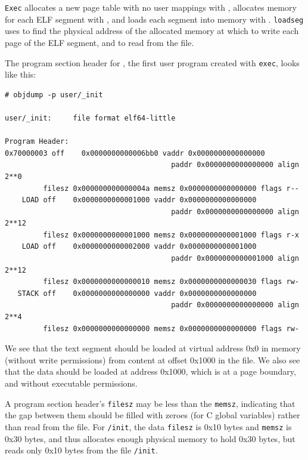 \lstinline{Exec}
allocates a new page table with no user mappings with
,
allocates memory for each ELF segment with
,
and loads each segment into memory with
.
\lstinline{loadseg}
uses
to find the physical address of the allocated memory at which to write
each page of the ELF segment, and
to read from the file.

The program section header for
,
the first user program created with
\lstinline{exec},
looks like this:
\begin{footnotesize}
\begin{verbatim}
# objdump -p user/_init

user/_init:     file format elf64-little

Program Header:
0x70000003 off    0x0000000000006bb0 vaddr 0x0000000000000000
                                       paddr 0x0000000000000000 align 2**0
         filesz 0x000000000000004a memsz 0x0000000000000000 flags r--
    LOAD off    0x0000000000001000 vaddr 0x0000000000000000
                                       paddr 0x0000000000000000 align 2**12
         filesz 0x0000000000001000 memsz 0x0000000000001000 flags r-x
    LOAD off    0x0000000000002000 vaddr 0x0000000000001000
                                       paddr 0x0000000000001000 align 2**12
         filesz 0x0000000000000010 memsz 0x0000000000000030 flags rw-
   STACK off    0x0000000000000000 vaddr 0x0000000000000000
                                       paddr 0x0000000000000000 align 2**4
         filesz 0x0000000000000000 memsz 0x0000000000000000 flags rw-
\end{verbatim}
\end{footnotesize}

We see that the text segment should be loaded at virtual address 0x0
in memory (without write permissions) from content at offset
0x1000 in the file. We also see that the data should be loaded at
address 0x1000, which is at a page boundary, and without executable
permissions.

A program section header's
\lstinline{filesz}
may be less than the
\lstinline{memsz},
indicating that the gap between them should be filled
with zeroes (for C global variables) rather than read from the file.
For
\lstinline{/init}, the data
\lstinline{filesz}
is 0x10 bytes and
\lstinline{memsz}
is 0x30 bytes,
and thus
allocates enough physical memory to hold 0x30 bytes, but reads only 0x10 bytes
from the file
\lstinline{/init}.

